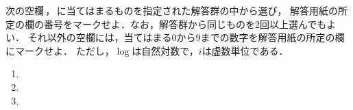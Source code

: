 \documentclass[../../../uem_mei_q.tex]{subfiles}
\begin{document}
    次の空欄\:\,，\,\:に当てはまるものを指定された解答群の中から選び，%
    解答用紙の所定の欄の番号をマークせよ．なお，解答群から同じものを2回以上選んでもよい．%
    それ以外の空欄には，当てはまる0から9までの数字を解答用紙の所定の欄にマークせよ．%
    ただし，$\log$は自然対数で，$i$は虚数単位である．
    
    \begin{enumerate}
        \item 
        \item 
        \item 
    \end{enumerate}
\end{document}

